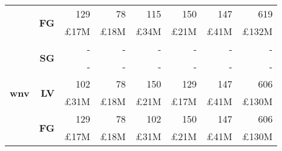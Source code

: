 \begin{table}[!htbp]
\begin{tabular}{r|r|r|r|r|r|r|r}
\cline{2-8}
& \multirow{2}{*}{\textbf{FG}}
& {129} & {78} & {115} & {150} & {147} & {619}\\
& {} & {\pounds17M} & {\pounds18M} & {\pounds34M} & {\pounds21M} & {\pounds41M} & {\pounds132M}\\
\hline
\multirow{6}{*}{\textbf{wnv}}
& \multirow{2}{*}{\textbf{SG}}
& {-} & {-} & {-} & {-} & {-} & {-}\\
& {} & {-} & {-} & {-} & {-} & {-} & {-}\\
\cline{2-8}
& \multirow{2}{*}{\textbf{LV}}
& {102} & {78} & {150} & {129} & {147} & {606}\\
& {} & {\pounds31M} & {\pounds18M} & {\pounds21M} & {\pounds17M} & {\pounds41M} & {\pounds130M}\\
\cline{2-8}
& \multirow{2}{*}{\textbf{FG}}
& {129} & {78} & {102} & {150} & {147} & {606}\\
& {} & {\pounds17M} & {\pounds18M} & {\pounds31M} & {\pounds21M} & {\pounds41M} & {\pounds130M}\\
\end{tabular}
\end{table}

